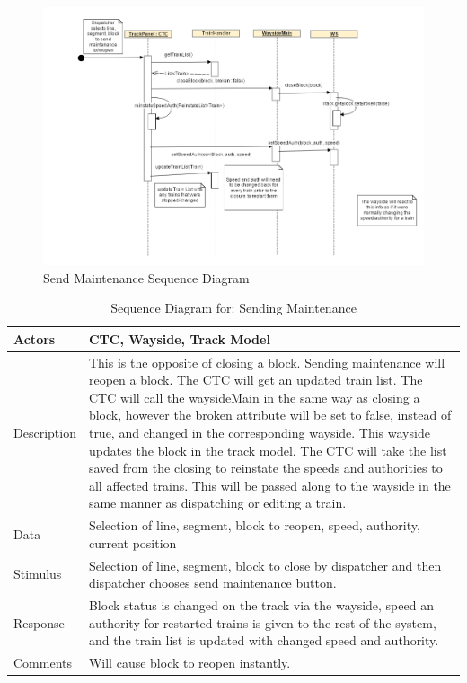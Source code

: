 \documentclass[]{article}
\begin{document}
\begin{figure}[H]
	\centering
	\includegraphics[width=\textwidth]{CTCsendMaint.png}
	\caption{Send Maintenance Sequence Diagram}
\end{figure}

\begin{table}[H]
	\centering
	\caption{Sequence Diagram for: Sending Maintenance}
	\begin{tabular}{|l|l|}
		\hline
		Actors & \parbox[t]{10cm}{CTC, Wayside, Track Model} \\ \hline
		Description & \parbox[t]{10cm}{This is the opposite of closing a block. Sending maintenance will reopen a block. The CTC will get an updated train list. The CTC will call the waysideMain in the same way as closing a block, however the broken attribute will be set to false, instead of true, and changed in the corresponding wayside. This wayside updates the block in the track model. The CTC will take the list saved from the closing to reinstate the speeds and authorities to all affected trains. This will be passed along to the wayside in the same manner as dispatching or editing a train.} \\ \hline
		Data &  \parbox[t]{10cm}{Selection of line, segment, block to reopen, speed, authority, current position} \\ \hline
		Stimulus &  \parbox[t]{10cm}{Selection of line, segment, block to close by dispatcher and then dispatcher chooses send maintenance button.} \\ \hline
		Response & \parbox[t]{10cm}{Block status is changed on the track via the wayside, speed an authority for restarted trains is given to the rest of the system, and the train list is updated with changed speed and authority.}\\ \hline
		Comments & \parbox[t]{10cm}{Will cause block to reopen instantly.}  \\ \hline
	\end{tabular}
\end{table}
\end{document}
